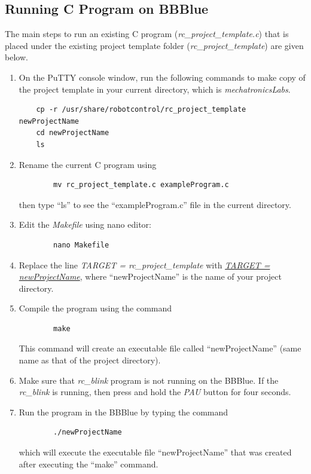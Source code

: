     \subsection{Running C Program on BBBlue}        
    The main steps to run an existing C program (\emph{rc\_project\_template.c}) that is placed under the existing project template folder (\emph{rc\_project\_template}) are given below. 
    
    \begin{enumerate}
    \item On the PuTTY console window, run the following commands to make copy of the project template in your current directory, which is \emph{mechatronicsLabs}. %
    \begin{verbatim}
    cp -r /usr/share/robotcontrol/rc_project_template newProjectName
    cd newProjectName
    ls 
    \end{verbatim}
%
    \item Rename the current C program using 
    \begin{verbatim}
        mv rc_project_template.c exampleProgram.c 
    \end{verbatim}
      then type ``ls'' to see the ``exampleProgram.c'' file in the current
      directory. 
    \item Edit the \emph{Makefile} using nano editor:
    \begin{verbatim}
        nano Makefile
    \end{verbatim}
    \item Replace the line \emph{TARGET = rc\_project\_template} with
      \underline{\emph{TARGET = newProjectName}}, where ``newProjectName'' is
      the name of your project directory. 
    
    \item Compile the program using the command
    \begin{verbatim}
        make 
\end{verbatim}
      This command will create an executable file called ``newProjectName''
      (same name as that of the project directory). 
    \item Make sure that \emph{rc\_blink} program is not running on the BBBlue. If the \emph{rc\_blink} is running, then press and hold the \emph{PAU} button for four seconds. 
    
    \item Run the program in the BBBlue by typing the command
    \begin{verbatim}
        ./newProjectName 
    \end{verbatim}
     which will execute the executable file ``newProjectName'' that was created
     after executing the ``make'' command.  
\end{enumerate}

